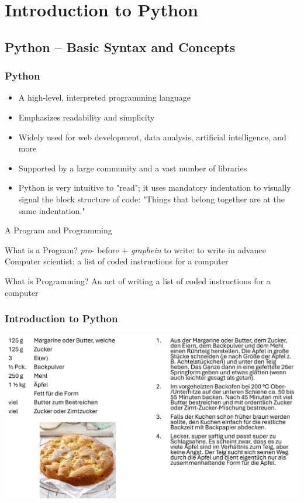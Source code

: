 \documentclass{beamer}
\begin{document}
\section{Introduction to Python}
\subsection{Python -- Basic Syntax and Concepts}
    \begin{frame}[fragile]
        \frametitle{Python}
        \begin{itemize}
            \item A high-level, interpreted programming language
            \item Emphasizes readability and simplicity
            \item Widely used for web development, data analysis, artificial intelligence, and more
            \item Supported by a large community and a vast number of libraries
            \item Python is very intuitive to "read"; it uses mandatory indentation to visually signal the block structure of code: "Things that belong together are at the same indentation."
        \end{itemize}
    \end{frame}

    \begin{frame}{A Program and Programming}
        \begin{block}{What is a Program?}
            \textit{pro}- before + \textit{graphein} to write: to write in advance \\
            Computer scientist: a list of coded instructions for a computer
        \end{block}
        \begin{block}{What is Programming?}
            An act of writing a list of coded instructions for a computer
        \end{block}
    \end{frame}

    \begin{frame}[fragile]
        \frametitle{Introduction to Python}
        \includegraphics[width=1\textwidth]{figures/Recipe.png}
    \end{frame}
\end{document}
